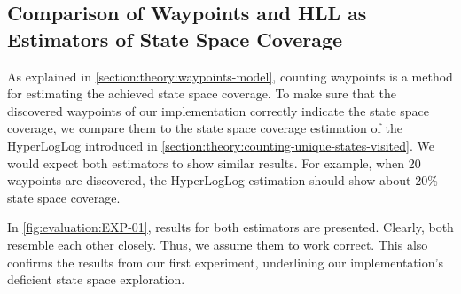 \documentclass[
fancyheadings, %
%
%
]{stsreprt}
\begin{document}
\subsection{Comparison of Waypoints and HLL as Estimators of State Space Coverage}

As explained in \cref{section:theory:waypoints-model}, counting waypoints is a method for estimating the achieved state space coverage.
To make sure that the discovered waypoints of our implementation correctly indicate the state space coverage, we compare them to the state space coverage estimation of the HyperLogLog introduced in \cref{section:theory:counting-unique-states-visited}.
We would expect both estimators to show similar results.
For example, when 20 waypoints are discovered, the HyperLogLog estimation should show about 20\% state space coverage.

In \cref{fig:evaluation:EXP-01}, results for both estimators are presented.
Clearly, both resemble each other closely.
Thus, we assume them to work correct.
This also confirms the results from our first experiment, underlining our implementation's deficient state space exploration.
\end{document}
